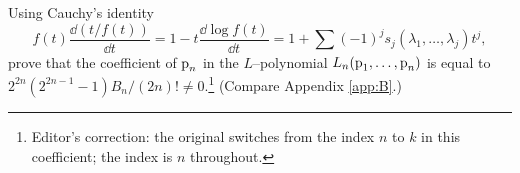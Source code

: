 \documentclass[../main]{subfiles}
\begin{document}
\begin{problem}\label{prob:19.C}
Using Cauchy's identity \[f(t) \frac {\dd(t/f(t))} {\dd t} = 1 - t \frac {\dd \log f(t)} {\dd t} = 1 + \sum (-1)^j s_j(\lambda_1, \ldots, \lambda_j) t^j,\] prove that the coefficient of $\operatorname{p}_n$ in the $L$--polynomial $L_n(\operatorname{p}_1, \ldots, \operatorname{p}_n)$ is equal to $2^{2n}(2^{2n - 1} - 1)B_n/(2n)! \ne 0$.\footnote{Editor's correction: the original switches from the index $n$ to $k$ in this coefficient; the index is $n$ throughout.} (Compare Appendix \ref{app:B}.)
\end{problem}
\end{document}
